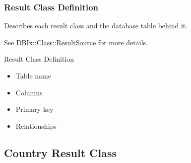 \subsubsection{Result Class Definition}
Describes each result class and the database table behind it. 

See \href{https://metacpan.org/pod/DBIx::Class::ResultSource}{DBIx::Class::ResultSource} for more details.

\begin{frame}{Result Class Definition}

\begin{itemize}
\item Table name
\item Columns
\item Primary key
\item Relationships
\end{itemize}
\end{frame}

\subsection{Country Result Class}


